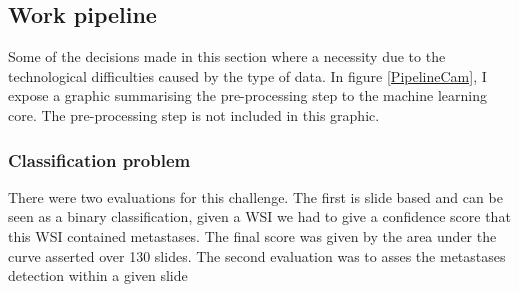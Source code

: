 \documentclass{article}
\begin{document}
\subsection{Work pipeline}
Some of the decisions made in this section where a necessity due to the technological difficulties caused by the type of data. In figure \ref{PipelineCam}, I expose a graphic summarising the pre-processing step to the machine learning core. The pre-processing step is not included in this graphic.
\subsubsection*{Classification problem}
There were two evaluations for this challenge. The first is slide based and can be seen as a binary classification, given a WSI we had to give a confidence score that this WSI contained metastases. The final score was given by the area under the curve asserted over 130 slides. The second evaluation was to asses the metastases detection within a given slide
\end{document}
